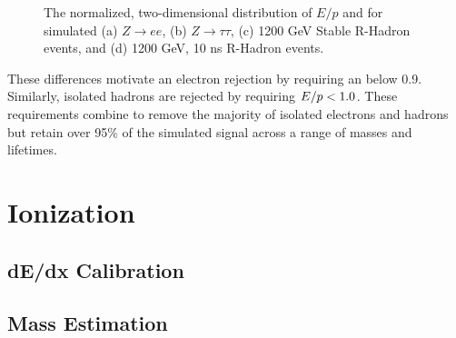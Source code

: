 \begin{figure}[htb]
{}
\caption{The normalized, two-dimensional distribution of $E/p$ and \emfrac for simulated (a) $Z\rightarrow ee$, (b) $Z\rightarrow \tau\tau$, (c) 1200 GeV Stable R-Hadron events, and (d) 1200 GeV, 10 ns R-Hadron events.}
\label{fig:eoverp_emfrac}
\end{figure}

These differences motivate an electron rejection by requiring an \emfrac below 0.9.
Similarly, isolated hadrons are rejected by requiring $E/p < 1.0$.
These requirements combine to remove the majority of isolated electrons and hadrons but retain over 95\% of the simulated signal across a range of masses and lifetimes.


\section{Ionization}

\subsection{dE/dx Calibration}

\subsection{Mass Estimation}
\label{sec:mass_requirement}
